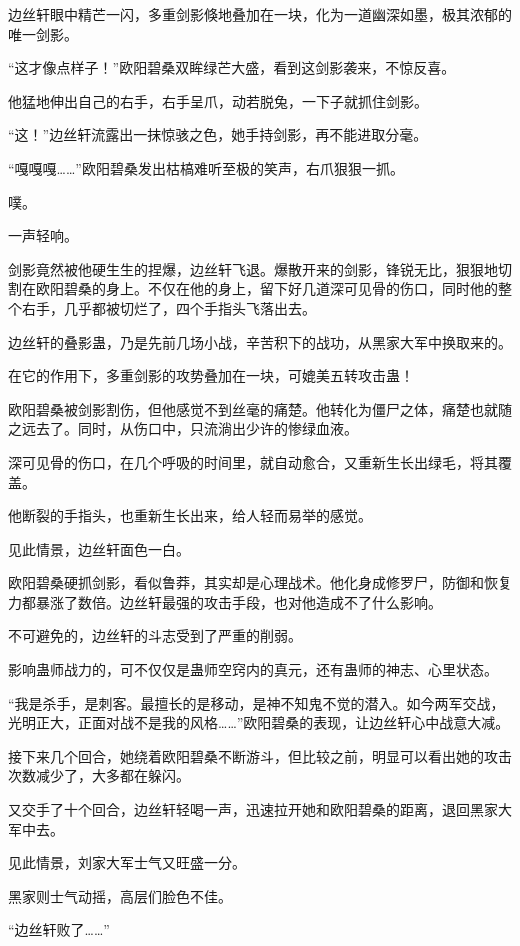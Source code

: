 \begin{this_body}
边丝轩眼中精芒一闪，多重剑影倏地叠加在一块，化为一道幽深如墨，极其浓郁的唯一剑影。

“这才像点样子！”欧阳碧桑双眸绿芒大盛，看到这剑影袭来，不惊反喜。

他猛地伸出自己的右手，右手呈爪，动若脱兔，一下子就抓住剑影。

“这！”边丝轩流露出一抹惊骇之色，她手持剑影，再不能进取分毫。

“嘎嘎嘎……”欧阳碧桑发出枯槁难听至极的笑声，右爪狠狠一抓。

噗。

一声轻响。

剑影竟然被他硬生生的捏爆，边丝轩飞退。爆散开来的剑影，锋锐无比，狠狠地切割在欧阳碧桑的身上。不仅在他的身上，留下好几道深可见骨的伤口，同时他的整个右手，几乎都被切烂了，四个手指头飞落出去。

边丝轩的叠影蛊，乃是先前几场小战，辛苦积下的战功，从黑家大军中换取来的。

在它的作用下，多重剑影的攻势叠加在一块，可媲美五转攻击蛊！

欧阳碧桑被剑影割伤，但他感觉不到丝毫的痛楚。他转化为僵尸之体，痛楚也就随之远去了。同时，从伤口中，只流淌出少许的惨绿血液。

深可见骨的伤口，在几个呼吸的时间里，就自动愈合，又重新生长出绿毛，将其覆盖。

他断裂的手指头，也重新生长出来，给人轻而易举的感觉。

见此情景，边丝轩面色一白。

欧阳碧桑硬抓剑影，看似鲁莽，其实却是心理战术。他化身成修罗尸，防御和恢复力都暴涨了数倍。边丝轩最强的攻击手段，也对他造成不了什么影响。

不可避免的，边丝轩的斗志受到了严重的削弱。

影响蛊师战力的，可不仅仅是蛊师空窍内的真元，还有蛊师的神志、心里状态。

“我是杀手，是刺客。最擅长的是移动，是神不知鬼不觉的潜入。如今两军交战，光明正大，正面对战不是我的风格……”欧阳碧桑的表现，让边丝轩心中战意大减。

接下来几个回合，她绕着欧阳碧桑不断游斗，但比较之前，明显可以看出她的攻击次数减少了，大多都在躲闪。

又交手了十个回合，边丝轩轻喝一声，迅速拉开她和欧阳碧桑的距离，退回黑家大军中去。

见此情景，刘家大军士气又旺盛一分。

黑家则士气动摇，高层们脸色不佳。

“边丝轩败了……”


\end{this_body}
